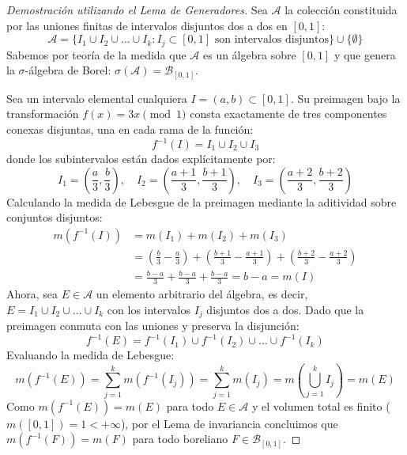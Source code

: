 \begin{proof}[Demostración utilizando el Lema de Generadores]
	Sea $\mathcal{A}$ la colección constituida por las uniones finitas de intervalos disjuntos dos a dos en $[0,1]$:
	$$ \mathcal{A} = \{ I_1 \cup I_2 \cup \dots \cup I_k : I_j \subset [0,1] \text{ son intervalos disjuntos} \} \cup \{\emptyset\} $$
	Sabemos por teoría de la medida que $\mathcal{A}$ es un álgebra sobre $[0,1]$ y que genera la $\sigma$-álgebra de Borel: $\sigma(\mathcal{A}) = \mathcal{B}_{[0,1]}$.
	
	Sea un intervalo elemental cualquiera $I = (a, b) \subset [0,1]$. Su preimagen bajo la transformación $f(x) = 3x \pmod 1$ consta exactamente de tres componentes conexas disjuntas, una en cada rama de la función:
	$$ f^{-1}(I) = I_1 \cup I_2 \cup I_3 $$
	donde los subintervalos están dados explícitamente por:
	$$ I_1 = \left(\frac{a}{3}, \frac{b}{3}\right), \quad I_2 = \left(\frac{a+1}{3}, \frac{b+1}{3}\right), \quad I_3 = \left(\frac{a+2}{3}, \frac{b+2}{3}\right) $$
	Calculando la medida de Lebesgue de la preimagen mediante la aditividad sobre conjuntos disjuntos:
	\begin{align*}
		m(f^{-1}(I)) &= m(I_1) + m(I_2) + m(I_3) \\
		&= \left(\frac{b}{3} - \frac{a}{3}\right) + \left(\frac{b+1}{3} - \frac{a+1}{3}\right) + \left(\frac{b+2}{3} - \frac{a+2}{3}\right) \\
		&= \frac{b-a}{3} + \frac{b-a}{3} + \frac{b-a}{3} = b - a = m(I)
	\end{align*}
	Ahora, sea $E \in \mathcal{A}$ un elemento arbitrario del álgebra, es decir, $E = I_1 \cup I_2 \cup \dots \cup I_k$ con los intervalos $I_j$ disjuntos dos a dos. Dado que la preimagen conmuta con las uniones y preserva la disjunción:
	$$ f^{-1}(E) = f^{-1}(I_1) \cup f^{-1}(I_2) \cup \dots \cup f^{-1}(I_k) $$
	Evaluando la medida de Lebesgue:
	$$ m(f^{-1}(E)) = \sum_{j=1}^k m(f^{-1}(I_j)) = \sum_{j=1}^k m(I_j) = m\left( \bigcup_{j=1}^k I_j \right) = m(E) $$
	Como $m(f^{-1}(E)) = m(E)$ para todo $E \in \mathcal{A}$ y el volumen total es finito ($m([0,1]) = 1 < +\infty$), por el Lema de invariancia concluimos que $m(f^{-1}(F)) = m(F)$ para todo boreliano $F \in \mathcal{B}_{[0,1]}$.
\end{proof}

